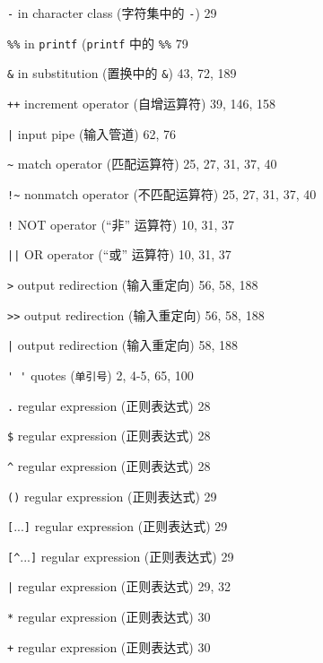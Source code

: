 \begin{multicols}{3}
\hangindent=3pc  \verb'-' in character class (字符集中的
\verb'-') 29

\hangindent=3pc  \verb'%%' in \verb'printf' (\verb'printf' 中的
\verb'%%' 79

\hangindent=3pc  \verb'&' in substitution (置换中的
\verb'&') 43, 72, 189

\hangindent=3pc  \verb'++' increment operator (自增运算符) 39, 146, 158

\hangindent=3pc  \verb'|' input pipe (输入管道) 62, 76

\hangindent=3pc  \verb'~' match operator (匹配运算符) 25, 27, 31, 37, 40

\hangindent=3pc  \verb'!~' nonmatch operator (不匹配运算符) 25, 27, 31, 37, 40

\hangindent=3pc  \verb'!' NOT operator (``非'' 运算符) 10, 31, 37

\hangindent=3pc  \verb'||' OR operator (``或'' 运算符) 10, 31, 37

\hangindent=3pc  \verb'>' output redirection (输入重定向) 56, 58, 188

\hangindent=3pc  \verb'>>' output redirection (输入重定向) 56, 58, 188

\hangindent=3pc  \verb'|' output redirection (输入重定向) 58, 188

\hangindent=3pc  \verb"' '" quotes (\verb'单引号') 2, 4-5, 65, 100

\hangindent=3pc  \verb'.' regular expression (正则表达式) 28

\hangindent=3pc  \verb'$' regular expression (正则表达式) 28

\hangindent=3pc  \verb'^' regular expression (正则表达式) 28

\hangindent=3pc  \verb'()' regular expression (正则表达式) 29

\hangindent=3pc  \verb'['...\verb']' regular expression
(正则表达式) 29

\hangindent=3pc  \verb'[^'...\verb']' regular expression
(正则表达式) 29

\hangindent=3pc  \verb'|' regular expression (正则表达式) 29, 32

\hangindent=3pc  \verb'*' regular expression (正则表达式) 30

\hangindent=3pc  \verb'+' regular expression (正则表达式) 30


\end{multicols}
